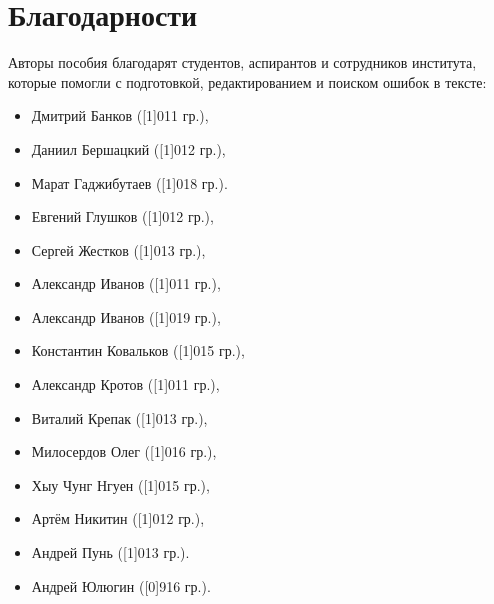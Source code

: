\section*{Благодарности}
Авторы пособия благодарят студентов, аспирантов и сотрудников института, которые помогли с подготовкой, редактированием и поиском ошибок в тексте:

\begin{itemize}
	\item Дмитрий Банков ([1]011 гр.),
	\item Даниил Бершацкий ([1]012 гр.),
	\item Марат Гаджибутаев ([1]018 гр.).
	\item Евгений Глушков ([1]012 гр.),
	\item Сергей Жестков ([1]013 гр.),
	\item Александр Иванов ([1]011 гр.),
	\item Александр Иванов ([1]019 гр.),
	\item Константин Ковальков ([1]015 гр.),
	\item Александр Кротов ([1]011 гр.),
	\item Виталий Крепак ([1]013 гр.),
	\item Милосердов Олег ([1]016 гр.),
	\item Хыу Чунг Нгуен ([1]015 гр.),
	\item Артём Никитин ([1]012 гр.),
	\item Андрей Пунь ([1]013 гр.).
	\item Андрей Юлюгин ([0]916 гр.).
\end{itemize}

